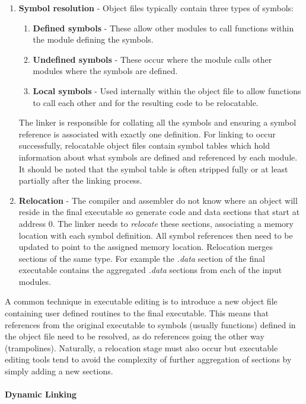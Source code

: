 \begin{enumerate}
 \item \textbf{Symbol resolution} - Object files typically contain three types of symbols:
  \begin{enumerate}
   \item \textbf{Defined symbols} - These allow other modules to call functions within the module defining the symbols.
   \item \textbf{Undefined symbols} - These occur where the module calls other modules where the symbols are defined.
   \item \textbf{Local symbols} - Used internally within the object file to allow functions to call each other and for the resulting code to be relocatable.
  \end{enumerate}

  The linker is responsible for collating all the symbols and ensuring a symbol reference is associated with exactly one definition. For linking to occur successfully, relocatable object files contain symbol tables which hold information about what symbols are defined and referenced by each module. It should be noted that the symbol table is often stripped fully or at least partially after the linking process.

 \item \textbf{Relocation} - The compiler and assembler do not know where an object will reside in the final executable so generate code and data sections that start at address 0. The linker needs to \emph{relocate} these sections, associating a memory location with each symbol definition. All symbol references then need to be updated to point to the assigned memory location. Relocation merges sections of the same type. For example the \emph{.data} section of the final executable contains the aggregated \emph{.data} sections from each of the input modules.
\end{enumerate}

A common technique in executable editing is to introduce a new object file containing user defined routines to the final executable. This means that references from the original executable to symbols (usually functions) defined in the object file need to be resolved, as do references going the other way (trampolines). Naturally, a relocation stage must also occur but executable editing tools tend to avoid the complexity of further aggregation of sections by simply adding a new sections.

\paragraph{Dynamic Linking}

